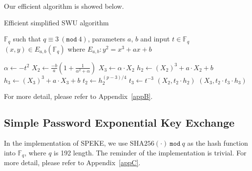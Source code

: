 \par Our efficient algorithm is showed below.
\begin{algorithm} 
\caption{Efficient simplified SWU algorithm \cite{brier2010efficient}}
\label{sswu}
  \begin{algorithmic}[1]
    \Require $\mathbb{F}_q$ such that $q \equiv 3\ (\texttt{mod}\ 4)$, parameters
$a$, $b$ and input $t \in \mathbb{F}_q$
    \Ensure $(x, y) \in E_{a,b}(\mathbb{F}_q)$ where $E_{a,b}: y^2 = x^3 + ax +
b$

    \State $\alpha \gets -t^2$
    \State $X_2 \gets \frac{-b}{a}(1+\frac{1}{\alpha^2+\alpha})$
    \State $X_3 \gets \alpha \cdot X_2$
    \State $h_2 \gets (X_2)^3 + a\cdot X_2 + b$
    \State $h_3 \gets (X_3)^3 + a\cdot X_3 + b$
    \State $t_2 \gets h_2^{(p-3)/4}$
    \State $t_3 \gets t^{-3}$
      \State \Return $(X_2, t_2 \cdot h_2)$
    \Else
      \State \Return $(X_3, t_2 \cdot t_3 \cdot h_3)$
    \EndIf
  \end{algorithmic}
\end{algorithm}
For more detail, please refer to Appendix~\ref{appB}.

\subsection{Simple Password Exponential Key Exchange}
In the implementation of SPEKE, we use $\mathrm{SHA256(\cdot)}\
\texttt{mod}\ q$ \cite{fips2002180} as the hash function into $\mathbb{F}_q$,
where $q$ is 192 length. The reminder of the implementation is 
trivial.  For more detail, please refer to Appendix~\ref{appC}.
